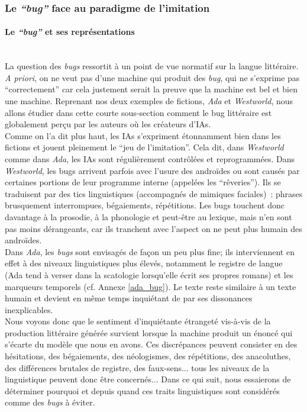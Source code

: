 \documentclass{article}
\newcommand{\subsubsubsection}[1]{\paragraph{#1}\mbox{}\\}
\begin{document}
			\subsubsection{Le \textit{``bug''} face au paradigme de l'imitation}\label{test_turing}
				\subsubsubsection{Le \textit{``bug''} et ses représentations}
					La question des \textit{bugs} ressortit à un point de vue normatif sur la langue littéraire. \textit{A priori}, on ne veut pas d'une machine qui produit des \textit{bug}, qui ne s'exprime pas ``correctement'' car cela justement serait la preuve que la machine est bel et bien une machine. Reprenant nos deux exemples de fictions, \textit{Ada} et \textit{Westworld}, nous allons étudier dans cette courte sous-section comment le bug littéraire est globalement perçu par les auteurs où les créateurs d'IAs.\\
					
					Comme on l'a dit plus haut, les IAs s'expriment étonnamment bien dans les fictions et jouent pleinement le ``jeu de l'imitation''. Cela dit, dans \textit{Westworld} comme dans \textit{Ada}, les IAs sont régulièrement contrôlées et reprogrammées. Dans \textit{Westworld}, les bugs arrivent parfois avec l'usure des androïdes ou sont causés par certaines portions de leur programme interne (appelées les ``rêveries''). Ils se traduisent par des tics linguistiques (accompagnés de mimiques faciales)~: phrases brusquement interrompues, bégaiements, répétitions. Les bugs touchent donc davantage à la prosodie, à la phonologie et peut-être au lexique, mais n'en sont pas moins dérangeants, car ils tranchent avec l'aspect on ne peut plus humain des androïdes.\\
					
					Dans \textit{Ada}, les \textit{bugs} sont envisagés de façon un peu plus fine; ils interviennent en effet à des niveaux linguistiques plus élevés, notamment le registre de langue (Ada tend à verser dans la scatologie lorsqu'elle écrit ses propres romans) et les marqueurs temporels (cf. Annexe \ref{ada_bug}). Le texte reste similaire à un texte humain et devient en même temps inquiétant de par ses dissonances inexplicables.\\
					
					
					Nous voyons donc que le sentiment d'inquiétante étrangeté vis-à-vis de la production littéraire générée survient lorsque la machine produit un énoncé qui s'écarte du modèle que nous en avons. Ces discrépances peuvent consister en des hésitations, des bégaiements, des néologismes, des répétitions, des anacoluthes, des différences brutales de registre, des faux-sens... tous les niveaux de la linguistique peuvent donc être concernés... Dans ce qui suit, nous essaierons de déterminer pourquoi et depuis quand ces traits linguistiques sont considérés comme des \textit{bugs} à éviter.
					
\end{document}
